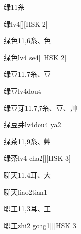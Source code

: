 \begin{entry}{绿}{11}{⽷}
  \begin{phonetics}{绿}{lv4}[][HSK 2]
  \end{phonetics}
\end{entry}

\begin{entry}{绿色}{11,6}{⽷、⾊}
  \begin{phonetics}{绿色}{lv4 se4}[][HSK 2]
  \end{phonetics}
\end{entry}

\begin{entry}{绿豆}{11,7}{⽷、⾖}
  \begin{phonetics}{绿豆}{lv4dou4}
  \end{phonetics}
\end{entry}

\begin{entry}{绿豆芽}{11,7,7}{⽷、⾖、⾋}
  \begin{phonetics}{绿豆芽}{lv4dou4 ya2}
  \end{phonetics}
\end{entry}

\begin{entry}{绿茶}{11,9}{⽷、⾋}
  \begin{phonetics}{绿茶}{lv4 cha2}[][HSK 3]
  \end{phonetics}
\end{entry}

\begin{entry}{聊天}{11,4}{⽿、⼤}
  \begin{phonetics}{聊天}{liao2tian1}
  \end{phonetics}
\end{entry}

\begin{entry}{职工}{11,3}{⽿、⼯}
  \begin{phonetics}{职工}{zhi2 gong1}[][HSK 3]
  \end{phonetics}
\end{entry}

